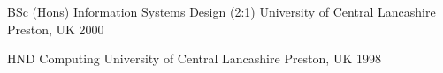 



\begin{cvhonors}


\cvhonor
{BSc (Hons) Information Systems Design (2:1)} %
{University of Central Lancashire} %
{Preston, UK} %
{2000} %


\cvhonor
{HND Computing} %
{University of Central Lancashire} %
{Preston, UK} %
{1998} %


\end{cvhonors}
